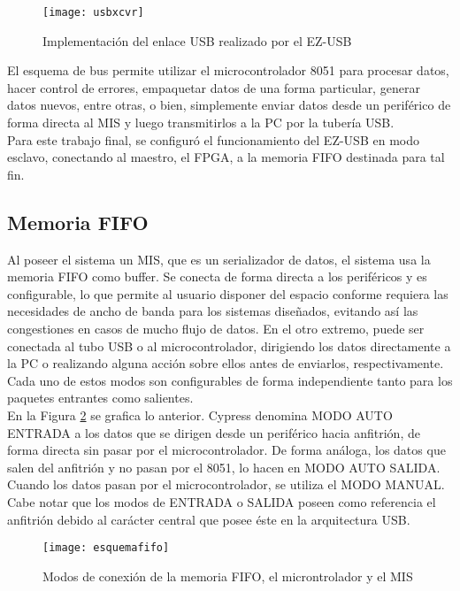 	\begin{figure}[h]
		\centering
		\texttt{[image: usbxcvr]}
		\caption{Implementación del enlace USB realizado por el EZ-USB}
		\label{usbxcvr}
	\end{figure}
	
	El esquema de bus permite utilizar el microcontrolador 8051 para procesar datos, hacer control de errores, empaquetar datos de una forma particular, generar datos nuevos, entre otras, o bien, simplemente enviar datos desde un periférico de forma directa al MIS y luego transmitirlos a la PC por la tubería USB.\\
	
	Para este trabajo final, se configuró el funcionamiento del EZ-USB en modo esclavo, conectando al maestro, el FPGA, a la memoria FIFO destinada para tal fin.\\
	
		\subsection*{Memoria FIFO}
		Al poseer el sistema un MIS, que es un serializador de datos, el sistema usa la memoria FIFO como buffer.%
		Se conecta de forma directa a los periféricos y es configurable, lo que permite al usuario disponer del espacio conforme requiera las necesidades de ancho de banda para los sistemas diseñados, evitando así las congestiones en casos de mucho flujo de datos. En el otro extremo, puede ser conectada al tubo USB o al microcontrolador, dirigiendo los datos directamente a la PC o realizando alguna acción sobre ellos antes de enviarlos, respectivamente. Cada uno de estos modos son configurables de forma independiente tanto para los paquetes entrantes como salientes.\\
		
		En la Figura \ref{modesfifo} se grafica lo anterior. Cypress denomina MODO AUTO ENTRADA a los datos que se dirigen desde un periférico hacia anfitrión, de forma directa sin pasar por el microcontrolador. De forma análoga, los datos que salen del anfitrión y no pasan por el 8051, lo hacen en MODO AUTO SALIDA. Cuando los datos pasan por el microcontrolador, se utiliza el MODO MANUAL. Cabe notar que los modos de ENTRADA o SALIDA poseen como referencia el anfitrión debido al carácter central que posee éste en la arquitectura USB.\\
		
		\begin{figure}
			\centering
			\texttt{[image: esquemafifo]}
			\caption{Modos de conexión de la memoria FIFO, el microntrolador y el MIS}
			\label{modesfifo}
		\end{figure}
		
